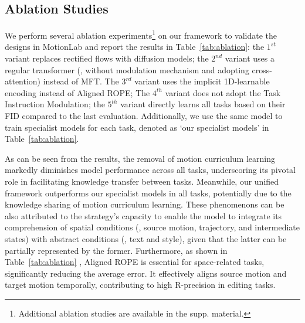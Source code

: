 \subsection{Ablation Studies}
We perform several ablation experiments\footnote{Additional ablation studies are available in the supp. material.} on our framework to validate the designs in MotionLab and report the results in Table~\ref{tab:ablation}: the $1^{st}$ variant replaces rectified flows with diffusion models; the $2^{nd}$ variant uses a regular transformer (\ie, without modulation mechanism and adopting cross-attention) instead of MFT. The $3^{rd}$ variant uses the implicit 1D-learnable encoding instead of Aligned ROPE; The $4^{th}$ variant does not adopt the Task Instruction Modulation; the $5^{th}$ variant directly learns all tasks based on their FID compared to the last evaluation. %
Additionally, we %
use the same model to train specialist models for each task, denoted as `our specialist models' in Table~\ref{tab:ablation}.

As can be seen from the results, the removal of motion curriculum learning markedly diminishes model performance across all tasks, underscoring its pivotal role in facilitating knowledge transfer between tasks. Meanwhile, our unified framework outperforms our specialist models in all tasks, potentially due to the knowledge sharing of motion curriculum learning. These phenomenons can be also attributed to the strategy's capacity to enable the model to integrate its comprehension of spatial conditions (\eg, source motion, trajectory, and intermediate states) with abstract conditions (\eg, text and style), given that the latter can be partially represented by the former. 
Furthermore, as shown in Table~\ref{tab:ablation}
, Aligned ROPE is essential for space-related tasks, significantly reducing the average error. It effectively aligns source motion and target motion temporally, contributing to high R-precision in editing tasks.

